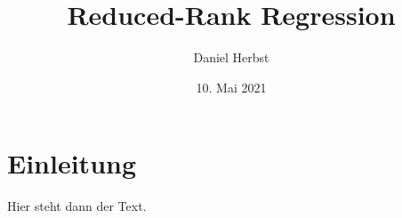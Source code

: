 \documentclass[]{article}
\title{Reduced-Rank Regression}
\author{Daniel Herbst}
\date{10. Mai 2021}
\begin{document}
\maketitle

\begin{abstract}

\end{abstract}

\section{Einleitung}

Hier steht dann der Text.
\end{document}
